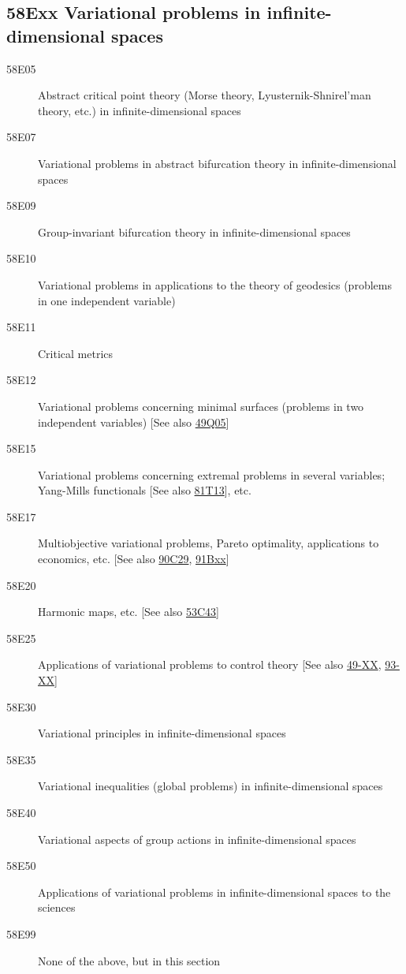 \subsection*{58Exx  Variational problems in infinite-dimensional spaces }\label{58Exx}
\begin{description}  
\item [58E05]\label{58E05} Abstract critical point theory (Morse theory, Lyusternik-Shnirel'man theory, etc.) in infinite-dimensional spaces
\item [58E07]\label{58E07} Variational problems in abstract bifurcation theory in infinite-dimensional spaces
\item [58E09]\label{58E09} Group-invariant bifurcation theory in infinite-dimensional spaces
\item [58E10]\label{58E10} Variational problems in applications to the theory of geodesics (problems in one independent variable) 
\item [58E11]\label{58E11} Critical metrics
\item [58E12]\label{58E12} Variational problems concerning minimal surfaces (problems in two independent variables) [See also \hyperref[49Q05]{49Q05}]
\item [58E15]\label{58E15} Variational problems concerning extremal problems in several variables; Yang-Mills functionals [See also \hyperref[81T13]{81T13}], etc.
\item [58E17]\label{58E17} Multiobjective variational problems, Pareto optimality, applications to economics, etc. [See also \hyperref[90C29]{90C29}, \hyperref[91Bxx]{91Bxx}]
\item [58E20]\label{58E20} Harmonic maps, etc. [See also \hyperref[53C43]{53C43}]
\item [58E25]\label{58E25} Applications of variational problems to control theory [See also \hyperref[49-XX]{49-XX}, \hyperref[93-XX]{93-XX}]
\item [58E30]\label{58E30} Variational principles in infinite-dimensional spaces
\item [58E35]\label{58E35} Variational inequalities (global problems) in infinite-dimensional spaces
\item [58E40]\label{58E40} Variational  aspects of group actions in infinite-dimensional spaces
\item [58E50]\label{58E50} Applications of variational problems in infinite-dimensional spaces to the sciences
\item [58E99]\label{58E99} None of the above, but in this section
\end{description}
